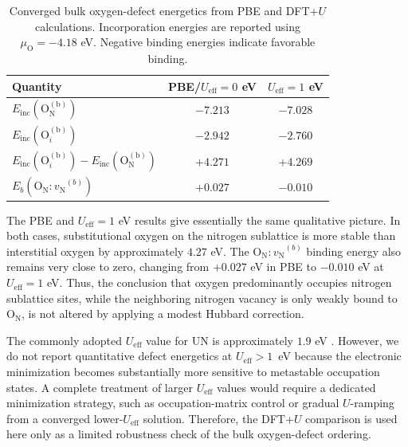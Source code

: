 \documentclass[preprint,12pt,sort&compress]{elsarticle}
\newcommand{\?}{\stackrel{?}{=}}
\begin{document}
\begin{table}[h!]
\centering
\caption{Converged bulk oxygen-defect energetics from PBE and DFT+$U$ calculations. Incorporation energies are reported using $\mu_\mathrm{O}=-4.18$ eV. Negative binding energies indicate favorable binding.}
\footnotesize
\begin{tabular}{lcc}
\hline
Quantity & PBE/$U_\text{eff}=0$ eV & $U_\text{eff}=1$ eV \\
\hline
$E_\text{inc}(\mathrm{O_N^{(b)}})$ & $-7.213$ & $-7.028$ \\
$E_\text{inc}(\text{O}_i^{(\text{b})})$ & $-2.942$ & $-2.760$ \\
$E_\text{inc}(\text{O}_i^{(\text{b})})-E_\text{inc}(\mathrm{O_N^{(b)}})$ & $+4.271$ & $+4.269$ \\
$E_b({\mathrm{O_N}:v_\mathrm{N}}^{(b)})$ & $+0.027$ & $-0.010$ \\
\hline
\end{tabular}
\label{Tab:BulkUSens}
\end{table}

The PBE and $U_\text{eff}=1$ eV results give essentially the same qualitative picture. In both cases, substitutional oxygen on the nitrogen sublattice is more stable than interstitial oxygen by approximately $4.27$ eV. The ${\mathrm{O_N}:v_\mathrm{N}}^{(b)}$ binding energy also remains very close to zero, changing from $+0.027$ eV in PBE to $-0.010$ eV at $U_\text{eff}=1$ eV. Thus, the conclusion that oxygen predominantly occupies nitrogen sublattice sites, while the neighboring nitrogen vacancy is only weakly bound to $\mathrm{O_N}$, is not altered by applying a modest Hubbard correction.

The commonly adopted $U_\text{eff}$ value for UN is approximately $1.9$ eV \cite{Claisse2016b,Kocevski2022I}. However, we do not report quantitative defect energetics at $U_\text{eff} > 1$~eV because the electronic minimization becomes substantially more sensitive to metastable occupation states. A complete treatment of larger $U_\text{eff}$ values would require a dedicated minimization strategy, such as occupation-matrix control or gradual $U$-ramping from a converged lower-$U_\text{eff}$ solution. Therefore, the DFT+$U$ comparison is used here only as a limited robustness check of the bulk oxygen-defect ordering.


\FloatBarrier
\newpage



\end{document}

